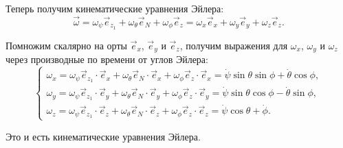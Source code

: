 Теперь получим кинематические уравнения Эйлера:
\[
    \vec{\omega} = \omega_\psi\vec{e}_{z_1} + \omega_\theta\vec{e}_N +
    \omega_\phi\vec{e}_z = \omega_x\vec{e}_x + \omega_y\vec{e}_y +
    \omega_z\vec{e}_z.
\]

Помножим скалярно на орты \( \vec{e}_x \), \( \vec{e}_y \) и \( \vec{e}_z \),
получим выражения для \( \omega_x \), \( \omega_y \) и \( \omega_z \) через
производные по времени от углов Эйлера:
\[
    \left\{ \begin{array}{l}
        \omega_x = \omega_\psi\vec{e}_{z_1}\cdot\vec{e}_x +
        \omega_\theta\vec{e}_N\cdot\vec{e}_x +\omega_\phi\vec{e}_z\cdot\vec{e}_x
        = \dot{\psi}\sin\theta\sin\phi + \dot{\theta}\cos\phi, \\
        \omega_y = \omega_\psi\vec{e}_{z_1}\cdot\vec{e}_y +
        \omega_\theta\vec{e}_N\cdot\vec{e}_y +\omega_\phi\vec{e}_z\cdot\vec{e}_y
        = \dot{\psi}\sin\theta\cos\phi - \dot{\theta}\sin\phi, \\
        \omega_z = \omega_\psi\vec{e}_{z_1}\cdot\vec{e}_z +
        \omega_\theta\vec{e}_N\cdot\vec{e}_z +\omega_\phi\vec{e}_z\cdot\vec{e}_z
        = \dot{\psi}\cos\theta + \dot\phi.
    \end{array} \right.
\]

Это и есть кинематические уравнения Эйлера.
\newpage